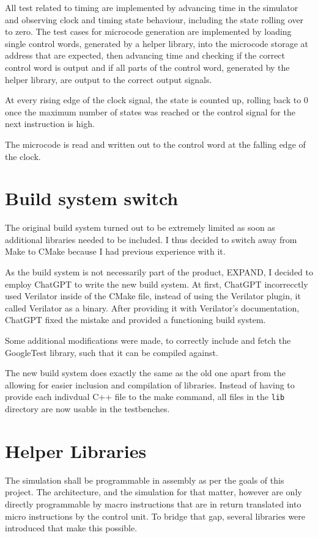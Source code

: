 All test related to timing are implemented by advancing time in the simulator and observing clock and timing state behaviour, including the state rolling over to zero. The test cases for microcode generation are implemented by loading single control words, generated by a helper library, into the microcode storage at address that are expected, then advancing time and checking if the correct control word is output and if all parts of the control word, generated by the helper library, are output to the correct output signals. 

At every rising edge of the clock signal, the state is counted up, rolling back to 0 once the maximum number of states was reached or the control signal for the next instruction is high.


The microcode is read and written out to the control word at the falling edge of the clock. 

\section{Build system switch}
The original build system turned out to be extremely limited as soon as additional libraries needed to be included. I thus decided to switch away from Make to CMake because I had previous experience with it.

As the build system is not necessarily part of the product, EXPAND, I decided to employ ChatGPT to write the new build system. At first, ChatGPT incorrecctly used Verilator inside of the CMake file, instead of using the Verilator plugin, it called Verilator as a binary. After providing it with Verilator's documentation, ChatGPT fixed the mistake and provided a functioning build system. 

Some additional modifications were made, to correctly include and fetch the GoogleTest library, such that it can be compiled against. 

The new build system does exactly the same as the old one apart from the allowing for easier inclusion and compilation of libraries. Instead of having to provide each indivdual C++ file to the make command, all files in the \texttt{lib} directory are now usable in the testbenches.

\section{Helper Libraries}
The simulation shall be programmable in assembly as per the goals of this project. The architecture, and the simulation for that matter, however are only directly programmable by macro instructions that are in return translated into micro instructions by the control unit. To bridge that gap, several libraries were introduced that make this possible. 

